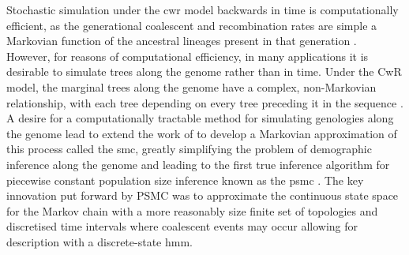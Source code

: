 Stochastic simulation under the \gls{cwr} model backwards in time is computationally efficient, as the generational coalescent and recombination rates are simple a Markovian function of the ancestral lineages present in that generation \cite{RR1983}. However, for reasons of computational efficiency, in many applications it is desirable to simulate trees along the genome rather than in time. Under the CwR model, the marginal trees along the genome have a complex, non-Markovian relationship, with each tree depending on every tree preceding it in the sequence \cite{C1999}. A desire for a computationally tractable method for simulating genologies along the genome lead \textcite{McVean2005a} to extend the work of \textcite{C1999} to develop a Markovian approximation of this process called the \gls{smc}, greatly simplifying the problem of demographic inference along the genome and leading to the first true inference algorithm for piecewise constant population size inference known as the \gls{psmc} \cite{Li2011a}. The key innovation put forward by PSMC was to approximate the continuous state space for the Markov chain with a more reasonably size finite set of topologies and discretised time intervals where coalescent events may occur allowing for description with a discrete-state \gls{hmm}. 
